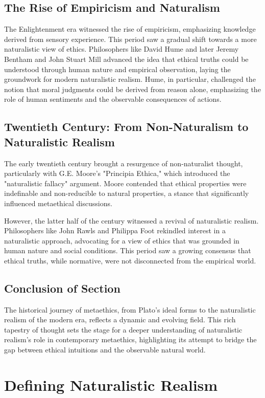 \documentclass[12pt,a4paper]{article}
\begin{document}
\subsection{The Rise of Empiricism and Naturalism}
The Enlightenment era witnessed the rise of empiricism, emphasizing knowledge derived from sensory experience. This period saw a gradual shift towards a more naturalistic view of ethics. Philosophers like David Hume and later Jeremy Bentham and John Stuart Mill advanced the idea that ethical truths could be understood through human nature and empirical observation, laying the groundwork for modern naturalistic realism. Hume, in particular, challenged the notion that moral judgments could be derived from reason alone, emphasizing the role of human sentiments and the observable consequences of actions.

\subsection{Twentieth Century: From Non-Naturalism to Naturalistic Realism}
The early twentieth century brought a resurgence of non-naturalist thought, particularly with G.E. Moore's "Principia Ethica," which introduced the "naturalistic fallacy" argument. Moore contended that ethical properties were indefinable and non-reducible to natural properties, a stance that significantly influenced metaethical discussions.

However, the latter half of the century witnessed a revival of naturalistic realism. Philosophers like John Rawls and Philippa Foot rekindled interest in a naturalistic approach, advocating for a view of ethics that was grounded in human nature and social conditions. This period saw a growing consensus that ethical truths, while normative, were not disconnected from the empirical world.

\subsection{Conclusion of Section}
The historical journey of metaethics, from Plato's ideal forms to the naturalistic realism of the modern era, reflects a dynamic and evolving field. This rich tapestry of thought sets the stage for a deeper understanding of naturalistic realism's role in contemporary metaethics, highlighting its attempt to bridge the gap between ethical intuitions and the observable natural world.

\section{Defining Naturalistic Realism}
\end{document}
